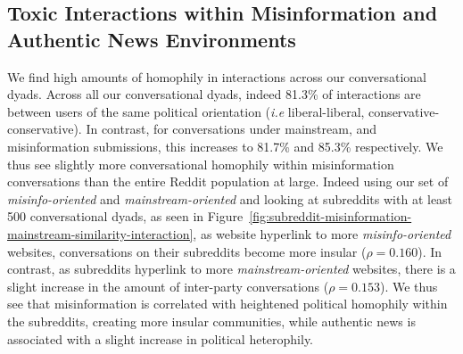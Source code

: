 \subsection{Toxic Interactions within Misinformation and Authentic News Environments}
We find high amounts of homophily in interactions across our conversational dyads. Across all our conversational dyads, indeed 81.3\% of interactions are between users of the same political orientation (\textit{i.e} liberal-liberal, conservative-conservative). In contrast, for conversations under mainstream, and misinformation submissions, this increases to 81.7\% and 85.3\% respectively. We thus see slightly more conversational homophily within misinformation conversations than the entire Reddit population at large. Indeed using our set of \textit{misinfo-oriented} and \textit{mainstream-oriented} and looking at subreddits with at least 500 conversational dyads, as seen in Figure~\ref{fig:subreddit-misinformation-mainstream-similarity-interaction}, as website hyperlink to more \textit{misinfo-oriented} websites, conversations on their subreddits become more insular ($\rho =0.160$). In contrast, as subreddits hyperlink to more \textit{mainstream-oriented} websites, there is a slight increase in the amount of inter-party conversations ($\rho =0.153$). We thus see that misinformation is correlated with heightened political homophily within the subreddits, creating more insular communities, while authentic news is associated with a slight increase in political heterophily.


